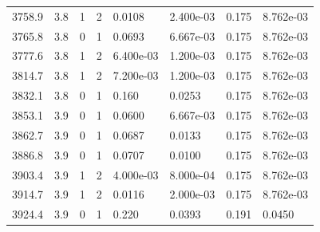 \documentclass[preview]{standalone}
\begin{document}
{{{{{{{\begin{tabular}{L{1.2cm}C{1.2cm} C{0.3cm}C{0.5cm} C{1.4cm}C{1.4cm} C{1.4cm}C{1.4cm}}
  3758.9  &   3.8  & 1     &  2 &  0.0108  & 2.400e-03  & 0.175 &  8.762e-03   \\ 
  3765.8  &   3.8  & 0     &  1 &  0.0693  & 6.667e-03  & 0.175 &  8.762e-03   \\ 
  3777.6  &   3.8  & 1     &  2 &  6.400e-03  & 1.200e-03  & 0.175 &  8.762e-03   \\ 
  3814.7  &   3.8  & 1     &  2 &  7.200e-03  & 1.200e-03  & 0.175 &  8.762e-03   \\ 
  3832.1  &   3.8  & 0     &  1 &  0.160  & 0.0253  & 0.175 &  8.762e-03   \\ 
  3853.1  &   3.9  & 0     &  1 &  0.0600  & 6.667e-03  & 0.175 &  8.762e-03   \\ 
  3862.7  &   3.9  & 0     &  1 &  0.0687  & 0.0133  & 0.175 &  8.762e-03   \\ 
  3886.8  &   3.9  & 0     &  1 &  0.0707  & 0.0100  & 0.175 &  8.762e-03   \\ 
  3903.4  &   3.9  & 1     &  2 &  4.000e-03  & 8.000e-04  & 0.175 &  8.762e-03   \\ 
  3914.7  &   3.9  & 1     &  2 &  0.0116  & 2.000e-03  & 0.175 &  8.762e-03   \\ 
  3924.4  &   3.9  & 0     &  1 &  0.220  & 0.0393  & 0.191 &  0.0450   \\ 
\hline 
\end{tabular} 

}}}}}}}
\end{document}
